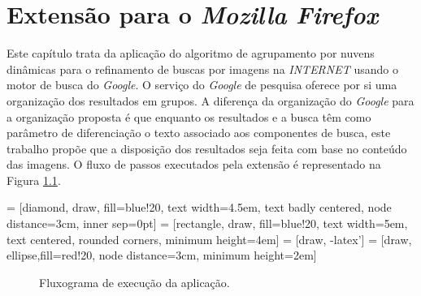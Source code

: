 \chapter{Extensão para o \emph{Mozilla Firefox}}
Este capítulo trata da aplicação do algoritmo de agrupamento por nuvens dinâmicas para o refinamento de buscas por imagens na \emph{INTERNET} usando o motor de busca do \emph{Google}. O serviço do \emph{Google} de pesquisa oferece por si uma organização dos resultados em grupos. A diferença da organização do \emph{Google} para a organização proposta é que enquanto os resultados e a busca têm como parâmetro de diferenciação o texto associado aos componentes de busca, este trabalho propõe que a disposição dos resultados seja feita com base no conteúdo das imagens. O fluxo de passos executados pela extensão é representado na Figura \ref{fluxo_aplicacoes}.

 = [diamond, draw, fill=blue!20, 
    text width=4.5em, text badly centered, node distance=3cm, inner sep=0pt]
 = [rectangle, draw, fill=blue!20, 
    text width=5em, text centered, rounded corners, minimum height=4em]
 = [draw, -latex']
 = [draw, ellipse,fill=red!20, node distance=3cm,
    minimum height=2em]
    
\begin{figure}[htb]
\caption{\label{fluxo_aplicacoes}Fluxograma de execução da aplicação.}
\begin{center}
\end{center}
\end{figure}

